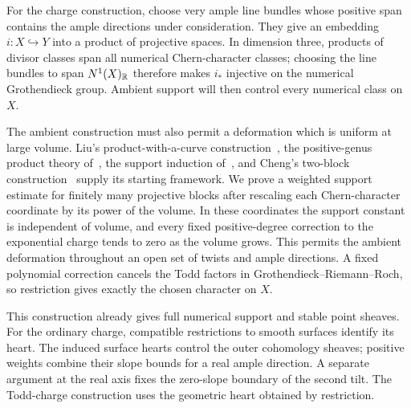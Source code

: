 For the charge construction, choose very ample line bundles whose
positive span contains the ample directions under consideration. They
give an embedding $i:X\hookrightarrow Y$ into a product of projective
spaces. In dimension three, products of divisor classes span all
numerical Chern-character classes; choosing the line bundles to span
$N^1(X)_{\mathbb R}$ therefore makes $i_*$ injective on the numerical
Grothendieck group. Ambient support will then control every numerical
class on $X$.

The ambient construction must also permit a deformation which is uniform
at large volume. Liu's product-with-a-curve
construction~\cite{LiuProduct2021}, the positive-genus product theory
of~\cite{ProductsCurves2025}, the support induction
of~\cite{LiEtAl2026}, and Cheng's two-block
construction~\cite{Cheng2026} supply its starting framework. We prove
a weighted support estimate for finitely many projective blocks after
rescaling each Chern-character coordinate by its power of the volume.
In these coordinates the support constant is independent of volume, and
every fixed positive-degree correction to the exponential charge tends
to zero as the volume grows. This permits the ambient deformation
throughout an open set of twists and ample directions. A fixed polynomial
correction cancels the Todd factors in Grothendieck--Riemann--Roch, so
restriction gives exactly the chosen character on $X$.

This construction already gives full numerical support and stable point
sheaves. For the ordinary charge, compatible restrictions to smooth
surfaces identify its heart. The induced surface hearts control the
outer cohomology sheaves; positive weights combine their slope bounds
for a real ample direction. A separate argument at the real axis fixes
the zero-slope boundary of the second tilt. The Todd-charge construction
uses the geometric heart obtained by restriction.

